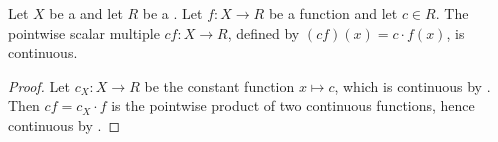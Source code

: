 \begin{proposition} \label{proposition:pointwise_scalar_multiple_of_continuous_function_on_topological_space_valued_in_topological_ring_is_continuous}
    Let $X$ be a  and let $R$ be a . Let $f : X \to R$ be a  function and let $c \in R$. The pointwise scalar multiple $c f : X \to R$, defined by $(c f)(x) = c \cdot f(x)$, is continuous.
\end{proposition}
\begin{proof}
    Let $c_X : X \to R$ be the constant function $x \mapsto c$, which is continuous by . Then $c f = c_X \cdot f$ is the pointwise product of two continuous functions, hence continuous by .
\end{proof}